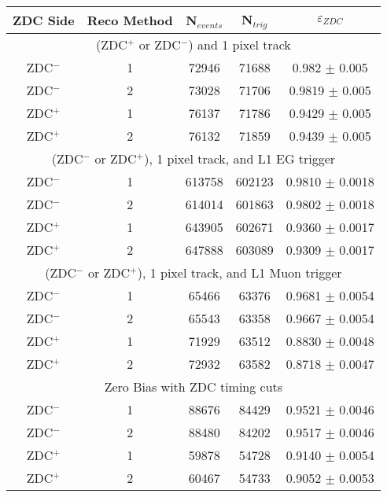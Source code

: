       \begin{table}
        \centering
        \begin{tabular}{|c|c|c|c|c|}
          \hline ZDC Side & Reco Method & N$_{events}$ & N$_{trig}$ & $\varepsilon_{ZDC}$ \\ \hline
           \multicolumn{5}{|c|}{(ZDC$^{+}$ or ZDC$^{-}$) and 1 pixel track} \\ \hline 
           ZDC$^{-}$ & 1 & 72946  & 71688 & 0.982 $\pm$ 0.005 \\ \hline
           ZDC$^{-}$ & 2 & 73028  & 71706  & 0.9819  $\pm$ 0.005  \\ \hline
           ZDC$^{+}$ & 1 & 76137  & 71786  & 0.9429  $\pm$ 0.005  \\ \hline
           ZDC$^{+}$ & 2 & 76132  & 71859  & 0.9439  $\pm$ 0.005  \\ \hline
           \multicolumn{5}{|c|}{(ZDC$^{-}$ or ZDC$^{+}$), 1 pixel track, and L1 EG trigger } \\ \hline 
           ZDC$^{-}$ & 1 & 613758  & 602123  & 0.9810 $\pm$ 0.0018 \\ \hline
           ZDC$^{-}$ & 2 & 614014  & 601863  & 0.9802 $\pm$ 0.0018 \\ \hline
           ZDC$^{+}$ & 1 & 643905  & 602671  & 0.9360  $\pm$ 0.0017 \\ \hline
           ZDC$^{+}$ & 2 & 647888  & 603089  & 0.9309  $\pm$ 0.0017 \\ \hline
           \multicolumn{5}{|c|}{(ZDC$^{-}$ or ZDC$^{+}$), 1 pixel track, and L1 Muon trigger} \\ \hline 
           ZDC$^{-}$ & 1 & 65466  & 63376  & 0.9681 $\pm$ 0.0054  \\ \hline
           ZDC$^{-}$ & 2 & 65543  & 63358  & 0.9667 $\pm$ 0.0054 \\ \hline
           ZDC$^{+}$ & 1 & 71929  & 63512  & 0.8830  $\pm$ 0.0048 \\ \hline
           ZDC$^{+}$ & 2 & 72932  & 63582  & 0.8718  $\pm$ 0.0047 \\ \hline
           \multicolumn{5}{|c|}{ Zero Bias with ZDC timing cuts} \\ \hline 
           ZDC$^{-}$ & 1 & 88676  & 84429  & 0.9521 $\pm$ 0.0046 \\ \hline
           ZDC$^{-}$ & 2 & 88480  & 84202  & 0.9517 $\pm$ 0.0046 \\ \hline
           ZDC$^{+}$ & 1 & 59878  & 54728  & 0.9140  $\pm$ 0.0054 \\ \hline
           ZDC$^{+}$ & 2 & 60467  & 54733  & 0.9052  $\pm$ 0.0053 \\ \hline

\end{tabular}
\end{table}
